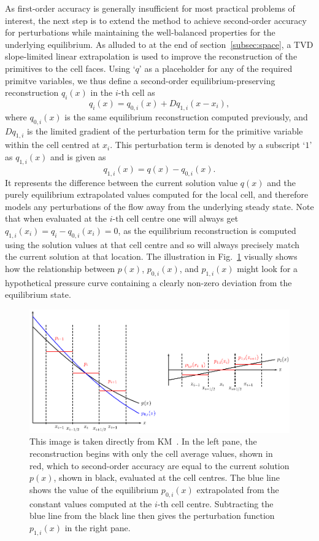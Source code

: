 As first-order accuracy is generally insufficient for most practical problems of interest, the next step is to extend the method to achieve second-order accuracy for perturbations while maintaining the well-balanced properties for the underlying equilibrium. As alluded to at the end of section~\ref{subsec:space}, a TVD slope-limited linear extrapolation is used to improve the reconstruction of the primitives to the cell faces. Using `$q$' as a placeholder for any of the required primitve variables, we thus define a second-order equilibrium-preserving reconstruction $q_i(x)$ in the $i\textrm{-th}$ cell as
\begin{equation}
q_i(x)=q_{0,i}(x)+Dq_{1,i}(x-x_i),
\end{equation}
where $q_{0,i}(x)$ is the same equilibrium reconstruction computed previously, and $Dq_{1,i}$ is the limited gradient of the perturbation term for the primitive variable within the cell centred at $x_i$. This perturbation term is denoted by a subscript `$1$' as $q_{1,i}(x)$ and is given as
\begin{equation}
q_{1,i}(x)=q(x)-q_{0,i}(x).
\end{equation}
It represents the difference between the current solution value $q(x)$ and the purely equilibrium extrapolated values computed for the local cell, and therefore models any perturbations of the flow away from the underlying steady state. Note that when evaluated at the $i\textrm{-th}$ cell centre one will always get $q_{1,i}(x_i)=q_i-q_{0,i}(x_i)=0$, as the equilibrium reconstruction is computed using the solution values at that cell centre and so will always precisely match the current solution at that location. The illustration in Fig.~\ref{fig:Kappeli1} visually shows how the relationship between $p(x)$, $p_{0,i}(x)$, and $p_{1,i}(x)$ might look for a hypothetical pressure curve containing a clearly non-zero deviation from the equilibrium state.
\begin {figure}
\centering
\includegraphics[width=13cm]{figures/Kaeppeli1}
\caption{This image is taken directly from KM~\cite{Kappeli2014}. In the left pane, the reconstruction begins with only the cell average values, shown in red, which to second-order accuracy are equal to the current solution $p(x)$, shown in black, evaluated at the cell centres. The blue line shows the value of the equilibrium $p_{0,i}(x)$ extrapolated from the constant values computed at the $i\textrm{-th}$ cell centre. Subtracting the blue line from the black line then gives the perturbation function $p_{1,i}(x)$ in the right pane.}
\label{fig:Kappeli1}
\end{figure}


